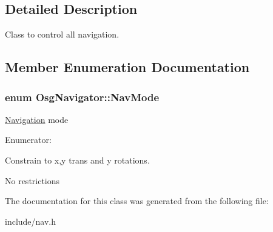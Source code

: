 \subsection{Detailed Description}
Class to control all navigation. 

\subsection{Member Enumeration Documentation}
\hypertarget{class_osg_navigator_af7e369e107a95154084e59e0a85aa18f}{
\subsubsection[{NavMode}]{\setlength{\rightskip}{0pt plus 5cm}enum {\bf OsgNavigator::NavMode}}}
\label{class_osg_navigator_af7e369e107a95154084e59e0a85aa18f}
\hyperlink{class_navigation}{Navigation} mode \begin{Desc}
\item[Enumerator: ]\par
\begin{description}
\item[{\em 
\hypertarget{class_osg_navigator_af7e369e107a95154084e59e0a85aa18fa6edd2fe6c30ecc32e3c6b77859995aa9}{
WALK}
\label{class_osg_navigator_af7e369e107a95154084e59e0a85aa18fa6edd2fe6c30ecc32e3c6b77859995aa9}
}]Constrain to x,y trans and y rotations. \item[{\em 
\hypertarget{class_osg_navigator_af7e369e107a95154084e59e0a85aa18fae4421b45468d2b0612d2b33eed264f64}{
FLY}
\label{class_osg_navigator_af7e369e107a95154084e59e0a85aa18fae4421b45468d2b0612d2b33eed264f64}
}]No restrictions \end{description}
\end{Desc}



The documentation for this class was generated from the following file:\begin{DoxyCompactItemize}
\item 
include/nav.h\end{DoxyCompactItemize}
